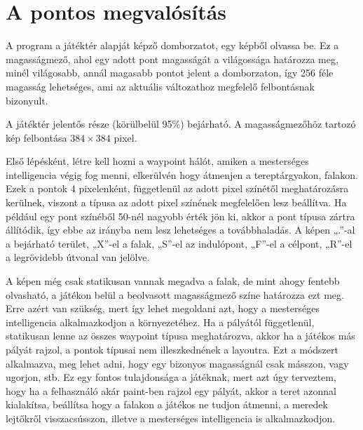\section{A pontos megvalósítás}

A program a játéktér alapját képző domborzatot, egy képből olvassa be. Ez a magasságmező, ahol egy adott pont magasságát a világossága határozza meg, minél világosabb, annál magasabb pontot jelent a domborzaton, így 256 féle magasság lehetséges, ami az aktuális változathoz megfelelő felbontásnak bizonyult. 

A játéktér jelentős része (körülbelül 95\%) bejárható. A magasságmezőhöz tartozó kép felbontása $384 \times 384$ pixel.



Első lépésként, létre kell hozni a waypoint hálót, amiken a mesterséges intelligencia végig fog menni, elkerülvén hogy átmenjen a tereptárgyakon, falakon. Ezek a pontok 4 pixelenként, függetlenül az adott pixel színétől meghatározásra kerülnek, viszont a típusa az adott pixel színének megfelelően lesz beállítva. Ha például egy pont színéből 50-nél nagyobb érték jön ki, akkor a pont típusa zártra állítódik, így ebbe az irányba nem lesz lehetséges a továbbhaladás. A képen „.”-al a bejárható terület, „X”-el a falak, „S”-el az indulópont, „F”-el a célpont, „R”-el a legrövidebb útvonal van jelölve.

A képen még csak statikusan vannak megadva a falak, de mint ahogy fentebb olvasható, a játékon belül a beolvasott magasságmező színe határozza ezt meg. Erre azért van szükség, mert így lehet megoldani azt, hogy a mesterséges intelligencia alkalmazkodjon a környezetéhez. Ha a pályától függetlenül, statikusan lenne az összes waypoint típusa meghatározva, akkor ha a játékos más pályát rajzol, a pontok típusai nem illeszkednének a layoutra. Ezt a módszert alkalmazva, meg lehet adni, hogy egy bizonyos magasságnál csak másszon, vagy ugorjon, stb. Ez egy fontos tulajdonsága a játéknak, mert azt úgy terveztem, hogy ha a felhasználó akár paint-ben rajzol egy pályát, akkor a teret azonnal kialakítsa, beállítsa hogy a falakon a játékos ne tudjon átmenni, a meredek lejtőkről visszacsússzon, illetve a mesterséges intelligencia is alkalmazkodjon.

